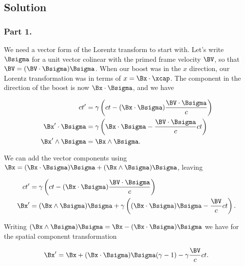 \subsection{Solution}
\subsubsection{Part 1.}

We need a vector form of the Lorentz transform to start with.  Let's write $\Bsigma$ for a unit vector colinear with the primed frame velocity $\BV$, so that $\BV = (\BV \cdot \Bsigma) \Bsigma$.  When our boost was in the $x$ direction, our Lorentz transformation was in terms of $x = \Bx \cdot \xcap$.  The component in the direction of the boost is now $\Bx \cdot \Bsigma$, and we have

\begin{subequations}
\begin{align}\label{eqn:relativisticElectrodynamicsA1:200}
c t' &= \gamma \left( ct - (\Bx \cdot \Bsigma) \frac{\BV \cdot \Bsigma}{c} \right) \\
\Bx' \cdot \Bsigma &= \gamma \left( \Bx \cdot \Bsigma - \frac{\BV \cdot \Bsigma}{c} c t \right) \\
\Bx' \wedge \Bsigma &= \Bx \wedge \Bsigma .
\end{align}
\end{subequations}

We can add the vector components using $\Bx = (\Bx \cdot \Bsigma) \Bsigma + (\Bx \wedge \Bsigma) \Bsigma$, leaving

\begin{subequations}
\begin{align}\label{eqn:relativisticElectrodynamicsA1:210}
c t' &= \gamma \left( ct - (\Bx \cdot \Bsigma) \frac{\BV \cdot \Bsigma}{c} \right) \\
\Bx' &= (\Bx \wedge \Bsigma) \Bsigma + \gamma \left( (\Bx \cdot \Bsigma) \Bsigma - \frac{\BV}{c} c t \right) .
\end{align}
\end{subequations}

Writing $(\Bx \wedge \Bsigma) \Bsigma = \Bx - (\Bx \cdot \Bsigma)\Bsigma$ we have for the spatial component transformation

\begin{equation}\label{eqn:relativisticElectrodynamicsA1:220}
\Bx' = \Bx + (\Bx \cdot \Bsigma) \Bsigma (\gamma - 1) - \gamma \frac{\BV}{c} c t.
\end{equation}

